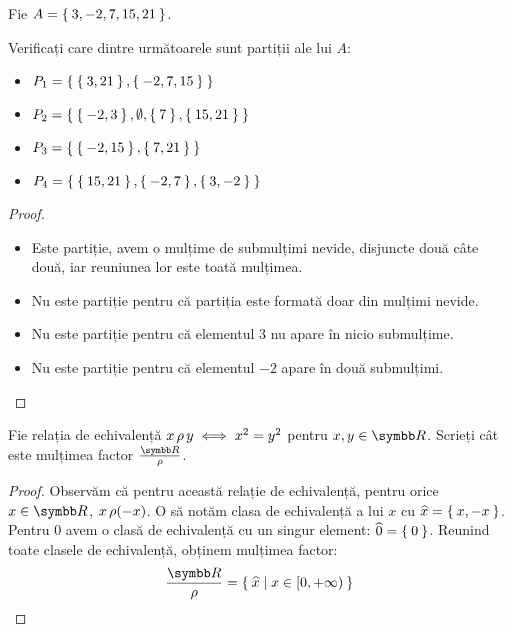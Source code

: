 \begin{exercise}
Fie \(A = \Set{ 3, -2, 7, 15, 21 }\).

Verificați care dintre următoarele sunt partiții ale lui \(A\):
\begin{itemize}
    \item \(P_1 = \Set{ \Set{3, 21}, \Set{-2, 7, 15} }\)
    \item \(P_2 = \Set{ \Set{ -2, 3 }, \emptyset, \Set{7}, \Set{15, 21} }\)
    \item \(P_3 = \Set{ \Set{ -2, 15 }, \Set{ 7, 21 } }\)
    \item \(P_4 = \Set{ \Set{ 15, 21 }, \Set{ -2, 7 }, \Set{ 3, -2 } }\)
\end{itemize}
\end{exercise}
\begin{proof}
~
\begin{itemize}
    \item Este partiție, avem o mulțime de submulțimi nevide, disjuncte două câte două, iar reuniunea lor este toată mulțimea.
    \item Nu este partiție pentru că partiția este formată doar din mulțimi nevide.
    \item Nu este partiție pentru că elementul \(3\) nu apare în nicio submulțime.
    \item Nu este partiție pentru că elementul \(-2\) apare în două submulțimi.
\end{itemize}
\end{proof}

\begin{exercise}
Fie relația de echivalență \(x \operatorname{\rho} y \iff x^2 = y^2\) pentru \(x, y \in \reals\). Scrieți cât este mulțimea factor \(\frac{\reals}{\rhoequiv}\).
\end{exercise}
\begin{proof}
Observăm că pentru această relație de echivalență, pentru orice \(x \in \reals\), \(x \operatorname{\rho} (-x)\). O să notăm clasa de echivalență a lui \(x\) cu \(\widehat{x} = \Set{x, -x}\). Pentru \(0\) avem o clasă de echivalență cu un singur element: \(\widehat{0} = \Set{ 0 }\).
Reunind toate clasele de echivalență, obținem mulțimea factor:
\[
    \frac{\reals}{\rhoequiv} = \Set{ \widehat{x} | x \in [0, +\infty) }
\]
\end{proof}

